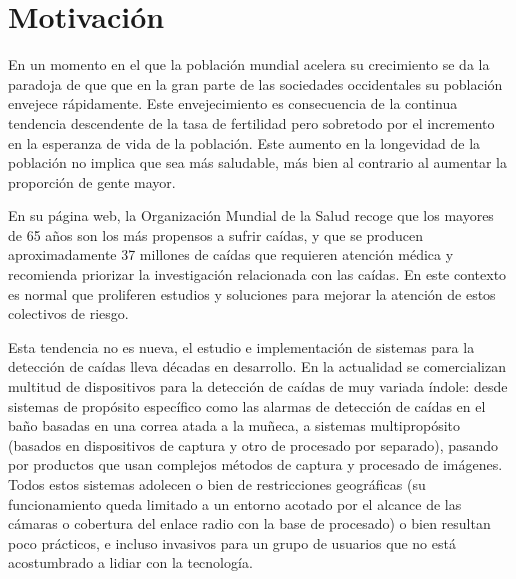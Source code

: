 \begin{comment}
Resumen esquemático de cada una de las partes del trabajo. Leer esta sección ha de dar una idea clara de lo que se pretendía y las conclusiones a las que se han llegado y del proceso seguido. Es uno de los capítulos mas importantes

Motivación:
Problema a tratar, posibles causas, relevancia del problema

Planteamiento:
¿cómo se puede resolver el problema qué se propone descripción de objetivos en términos generales?

Estructura:
qué hay en cada uno de los subsiguientes capítulos
\end{comment}

\section{Motivación}\label{sec:intro:motivación}

En un momento en el que la población mundial acelera su crecimiento se da la paradoja de que que en la gran parte de las sociedades occidentales su población envejece rápidamente. Este envejecimiento es consecuencia de la continua tendencia descendente de la tasa de fertilidad pero sobretodo por el incremento en la esperanza de vida de la población. Este aumento en la longevidad de la población no implica que sea más saludable, más bien al contrario al aumentar la proporción de gente mayor.

En su página web, la Organización Mundial de la Salud recoge que los mayores de 65 años son los más propensos a sufrir caídas, y que se producen aproximadamente 37 millones de caídas que requieren atención médica y recomienda priorizar la investigación relacionada con las caídas\cite{FactsFalls2018}. En este contexto es normal que proliferen estudios y soluciones para mejorar la atención de estos colectivos de riesgo.

Esta tendencia no es nueva, el estudio e implementación de sistemas para la detección de caídas lleva décadas en desarrollo\cite{fallindex00, Chen2005, Noury2007, Bourke2006}. En la actualidad se comercializan multitud de dispositivos para la detección de caídas de muy variada índole: desde sistemas de propósito específico como las alarmas de detección de caídas en el baño basadas en una correa atada a la muñeca, a sistemas multipropósito (basados en dispositivos de captura y otro de procesado por separado), pasando por productos que usan complejos métodos de captura y procesado de imágenes. Todos estos sistemas adolecen o bien de restricciones geográficas (su funcionamiento queda limitado a un entorno acotado por el alcance de las cámaras o cobertura del enlace radio con la base de procesado) o bien resultan poco prácticos, e incluso invasivos para un grupo de usuarios que no está acostumbrado a lidiar con la tecnología.


